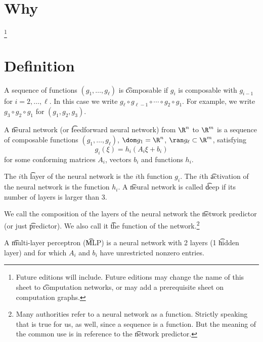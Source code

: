 
\section*{Why}
\footnote{Future editions will include. Future editions may change the name of this sheet to \t{computation networks}, or may add a prerequisite sheet on computation graphs.}
\section*{Definition}

A sequence of functions $(g_1, \dots , g_\ell )$ is \t{composable} if $g_i$ is composable with $g_{i-1}$ for $i = 2, \dots , \ell $.
In this case we write $g_\ell  \circ g_{\ell -1} \circ \cdots \circ g_2 \circ g_1$. For example, we write $g_3 \circ g_2 \circ g_1$ for $(g_1, g_2, g_3)$.

A \t{neural network} (or \t{feedforward neural network}) from $\R ^n$ to $\R ^m$ is a sequence of composable functions $(g_1, \dots , g_{\ell })$, $\dom g_1 = \R ^n$, $\ran g_\ell  \subset \R ^m$, satisfying
\[
g_i(\xi ) = h_i(A_i \xi  + b_i)
\]
for some conforming matrices $A_i$, vectors $b_i$ and functions $h_i$.

The $i$th \t{layer} of the neural network is the $i$th function $g_i$.
The $i$th \t{activation} of the neural network is the function $h_i$.
A \t{neural network} is called \t{deep} if its number of layers is larger than 3.

We call the composition of the layers of the neural network the \t{network predictor} (or just \t{predictor}).
We also call it \t{the function} of the network.\footnote{Many authorities refer to a neural network as a function. Strictly speaking that is true for us, as well, since a sequence is a function. But the meaning of the common use is in reference to the \t{network predictor}.}

A \t{multi-layer perceptron} (\t{MLP}) is a neural network with 2 layers (1 \t{hidden layer}) and for which $A_i$ and $b_i$ have unrestricted nonzero entries.


\blankpage